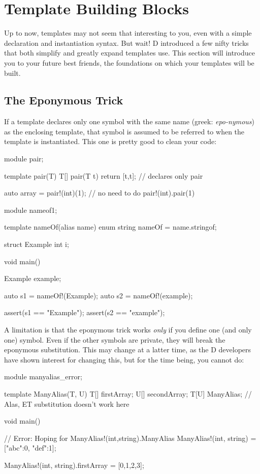 \section{Template Building Blocks}\label{buildingblocks}

Up to now, templates may not seem that interesting to you, even with a simple declaration and instantiation syntax. But wait! D introduced a few nifty tricks that both simplify and greatly expand templates use. This section will introduce you to your future best friends, the foundations on which your templates will be built.

\subsection{The Eponymous Trick}\label{eponymous}

If a template declares only one symbol with the same name (greek: \emph{epo-nymous}) as the enclosing template, that symbol is assumed to be referred to when the template is instantiated. This one is pretty good to clean your code:
\begin{dcode}
module pair;

template pair(T)
{
    T[] pair(T t) { return [t,t];} // declares only pair
}

auto array = pair!(int)(1);  // no need to do pair!(int).pair(1)
\end{dcode}

\begin{dcode}
module nameof1;

template nameOf(alias name)
{
    enum string nameOf = name.stringof;
}

struct Example { int i;}

void main()
{
    Example example;

    auto s1 = nameOf!(Example);
    auto s2 = nameOf!(example);

    assert(s1 == "Example");
    assert(s2 == "example");
}
\end{dcode}

A limitation is that the eponymous trick works \emph{only} if you define one (and only one) symbol. Even if the other symbols are private, they will break the eponymous substitution. This may change at a latter time, as the D developers have shown interest for changing this, but for the time being, you cannot do:

\begin{dcode}
module manyalias_error;

template ManyAlias(T, U)
{
    T[] firstArray;
    U[] secondArray;
    T[U] ManyAlias; // Alas, ET substitution doesn't work here
}

void main()
{
    // Error: Hoping for ManyAlias!(int,string).ManyAlias
    ManyAlias!(int, string) = ["abc":0, "def":1]; 

    ManyAlias!(int, string).firstArray = [0,1,2,3];
}
\end{dcode}

